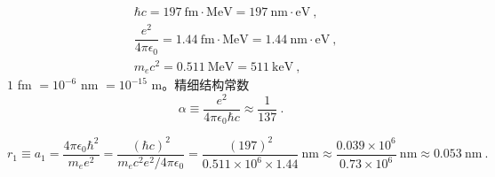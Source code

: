 \documentclass[12pt,a4paper]{article}
\begin{document}
\begin{align}
& \hbar c = 197 ~\text{fm} \cdot \text{MeV} = 197 ~\text{nm} \cdot \text{eV} ~, \\
& \dfrac{e^2}{4\pi \epsilon_0} = 1.44 ~\text{fm} \cdot \text{MeV} = 1.44 ~\text{nm} \cdot \text{eV} ~, \\
& m_e c^2 = 0.511 ~\text{MeV} = 511 ~\text{keV} ~,
\end{align}
$1$ fm $= 10^{-6}$ nm $= 10^{-15}$ m。精细结构常数
\begin{equation}
\alpha \equiv \dfrac{e^2}{4\pi \epsilon_0 \hbar c} \approx \dfrac{1}{137} ~.
\end{equation}

\begin{equation}
r_1 \equiv a_1 = \dfrac{4\pi \epsilon_0 \hbar^2}{m_e e^2} = \dfrac{(\hbar c)^2}{m_e c^2 e^2 /4\pi \epsilon_0} = \dfrac{(197)^2}{0.511\times 10^6 \times 1.44} ~\text{nm} \approx \dfrac{0.039 \times 10^6}{0.73 \times 10^6} ~\text{nm} \approx 0.053 ~\text{nm} ~.
\end{equation}





























\end{document}
